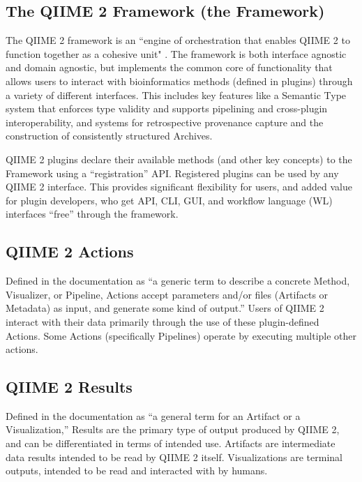 \subsection{The QIIME 2 Framework (the Framework)}

The QIIME 2 framework is an “engine of orchestration that enables QIIME 2 to
function together as a cohesive unit" \parencite{qiime_2_development_team_glossary_2018}.
The framework is both interface agnostic and domain agnostic, but implements the
common core of functionality that allows users to interact with bioinformatics
methods (defined in plugins) through a variety of different interfaces. This
includes key features like a Semantic Type system that enforces type validity
and supports pipelining and cross-plugin interoperability, and systems for
retrospective provenance capture and the construction of consistently structured
Archives.

QIIME 2 plugins declare their available methods (and other key concepts) to the
Framework using a “registration” API. Registered plugins can be used by any
QIIME 2 interface. This provides significant flexibility for users, and added
value for plugin developers, who get API, CLI, GUI, and workflow language (WL)
interfaces “free” through the framework.

\subsection{QIIME 2 Actions}

Defined in the documentation as “a generic term to describe a concrete Method,
Visualizer, or Pipeline, Actions accept parameters and/or files (Artifacts or
Metadata) as input, and generate some kind of output.” Users of QIIME 2 interact
with their data primarily through the use of these plugin-defined Actions. Some
Actions (specifically Pipelines) operate by executing multiple other actions.

\subsection{QIIME 2 Results}

Defined in the documentation as “a general term for an Artifact or a
Visualization,” Results are the primary type of output produced by QIIME 2, and
can be differentiated in terms of intended use. Artifacts are intermediate data
results intended to be read by QIIME 2 itself. Visualizations are terminal
outputs, intended to be read and interacted with by humans. 

